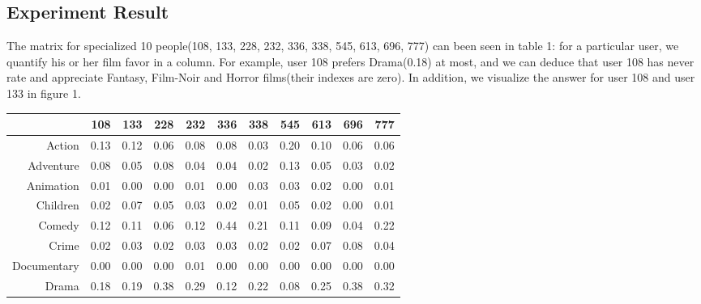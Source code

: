 \subsection{Experiment Result}
The matrix for specialized 10 people(108, 133, 228, 232, 336, 338, 545, 613, 696, 777) can been seen in table 1: for a particular user, we quantify his or her film favor in a column. For example, user 108 prefers Drama(0.18) at most, and we can deduce that user 108 has never rate and appreciate Fantasy, Film-Noir and Horror films(their indexes are zero). In addition, we visualize the answer for user 108 and user 133 in figure 1.
\begin{table}
\begin{tabular}{rrrrrrrrrrr}

           &        108 &        133 &        228 &        232 &        336 &        338 &        545 &        613 &        696 &        777  \\  \hline

    Action &      0.13  &      0.12  &      0.06  &      0.08  &      0.08  &      0.03  &      0.20  &      0.10  &      0.06  &      0.06  \\

 Adventure &      0.08  &      0.05  &      0.08  &      0.04  &      0.04  &      0.02  &      0.13  &      0.05  &      0.03  &      0.02  \\

 Animation &      0.01  &      0.00  &      0.00  &      0.01  &      0.00  &      0.03  &      0.03  &      0.02  &      0.00  &      0.01  \\

  Children &      0.02  &      0.07  &      0.05  &      0.03  &      0.02  &      0.01  &      0.05  &      0.02  &      0.00  &      0.01  \\

    Comedy &      0.12  &      0.11  &      0.06  &      0.12  &      0.44  &      0.21  &      0.11  &      0.09  &      0.04  &      0.22  \\

     Crime &      0.02  &      0.03  &      0.02  &      0.03  &      0.03  &      0.02  &      0.02  &      0.07  &      0.08  &      0.04  \\

Documentary &      0.00  &      0.00  &      0.00  &      0.01  &      0.00  &      0.00  &      0.00  &      0.00  &      0.00  &      0.00  \\

     Drama &      0.18  &      0.19  &      0.38  &      0.29  &      0.12  &      0.22  &      0.08  &      0.25  &      0.38  &      0.32  \\


\end{tabular}
\end{table}
